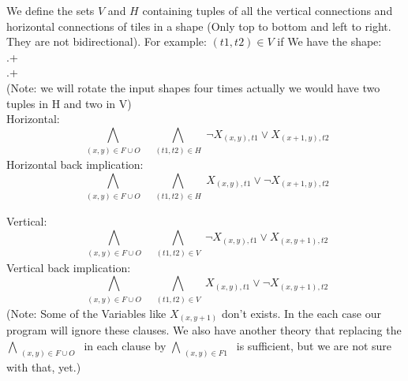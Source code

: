 \documentclass{../base/base}
\begin{document}
We define the sets $V$ and $H$ containing tuples of all the vertical connections and horizontal connections of tiles in a shape (Only top to bottom and left to right. They are not bidirectional).
For example: $(t1,t2) \in V$ if We have the shape:\\
.+\\
.+\\
(Note: we will rotate the input shapes four times actually we would have two tuples in H and two in V)\\

Horizontal:
$$\bigwedge_{\substack{(x,y) \in F\cup O}}\ \  \bigwedge_{\substack{(t1,t2) \in H}} \neg X_{(x,y),t1} \lor X_{(x+1,y),t2} $$
Horizontal back implication:
$$\bigwedge_{\substack{(x,y) \in F\cup O}}\ \  \bigwedge_{\substack{(t1,t2) \in H}} X_{(x,y),t1} \lor \neg X_{(x+1,y),t2} $$

Vertical:
$$\bigwedge_{\substack{(x,y) \in F\cup O}}\ \  \bigwedge_{\substack{(t1,t2) \in V}} \neg  X_{(x,y),t1} \lor X_{(x,y+1),t2} $$
Vertical back implication:
$$\bigwedge_{\substack{(x,y) \in F\cup O}}\ \  \bigwedge_{\substack{(t1,t2) \in V}} X_{(x,y),t1} \lor \neg X_{(x,y+1),t2} $$
(Note: Some of the Variables like $X_{(x,y+1)}$ don't exists. In the each case our program will ignore these clauses. We also have another theory that replacing the $\bigwedge_{\substack{(x,y) \in F\cup O}}$ in each clause by $\bigwedge_{\substack{(x,y) \in F1}}$ is sufficient, but we are not sure with that, yet.)
\end{document}

